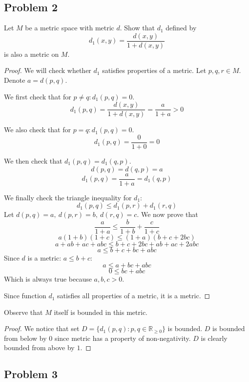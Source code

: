 \documentclass{article}
\begin{document}
\subsection*{Problem 2}

\begin{tcolorbox}
Let $M$ be a metric space with metric $d$. Show that $d_1$ defined by
$$ d_1 (x, y) = \frac{d(x, y)}{1 + d(x, y)} $$
is also a metric on $M$. 
\end{tcolorbox}

\begin{proof}
We will check whether $d_1$ satisfies properties of a metric. Let $p, q, r \in M$. Denote $a = d(p, q)$.

We first check that for $p \neq q : d_1(p, q) = 0 $.
$$ d_1(p, q) = \frac{d(x, y)}{1 + d(x, y)} = \frac{a}{1+a} > 0 $$

We also check that for $p = q : d_1(p, q) = 0$.
$$ d_1(p, q) = \frac{0}{1+0} = 0$$

We then check that $d_1(p, q) = d_1(q, p)$.
$$ d(p, q) = d(q, p) = a $$
$$ d_1(p, q) = \frac{a}{1+a} = d_1(q, p) $$

We finally check the triangle inequality for $d_1$:
$$ d_1(p, q) \leq d_1(p, r) + d_1(r, q)$$
Let $d(p, q) = a, \> d(p, r) = b, \> d(r, q) = c$.
We now prove that
$$ \frac{a}{1+a} \leq \frac{b}{1+b} + \frac{c}{1+c} $$
$$ a(1+b)(1+c) \leq (1+a)(b+c+2bc) $$
$$ a+ab+ac+abc \leq b+c+2bc+ab+ac+2abc $$
$$ a \leq b+c+bc+abc $$
Since $d$ is a metric: $a \leq b+c$:
$$ a \leq a+bc+abc $$
$$ 0 \leq bc+abc $$
Which is always true because $a,b,c > 0$.

Since function $d_1$ satisfies all properties of a metric, it is a metric.

\end{proof}

\begin{tcolorbox}
Observe that $M$ itself is bounded in this metric.
\end{tcolorbox}

\begin{proof}
We notice that set $D = \{ d_1(p,q) : p,q \in \mathbb{R}_{\geq 0} \}$ is bounded. $D$ is bounded from below by $0$ since metric has a property of non-negativity. $D$ is clearly bounded from above by $1$.
\end{proof}

\subsection*{Problem 3}
\end{document}
